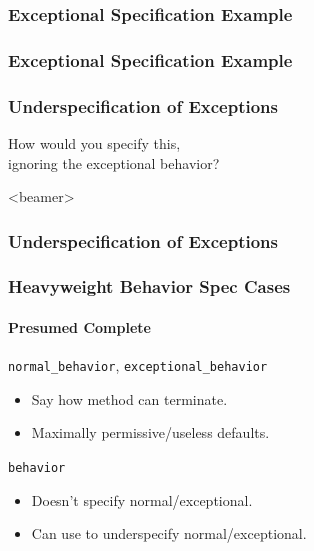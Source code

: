\begin{frame}[fragile]
\frametitle{Exceptional Specification Example}

\end{frame}

\begin{frame}[fragile]
\frametitle{Exceptional Specification Example}

\end{frame}

\begin{frame}
\frametitle{Underspecification of Exceptions}
\begin{question}
How would you specify this, \\
ignoring the exceptional behavior? 
\end{question}
\end{frame}

\begin{frame}<beamer>
\frametitle{Underspecification of Exceptions}

\end{frame}


\begin{frame}[fragile]
\frametitle{Heavyweight Behavior Spec Cases}
\framesubtitle{Presumed Complete}

\lstinline!normal_behavior!, \lstinline!exceptional_behavior!
\begin{itemize}
\item
Say how method can terminate.

\item
Maximally permissive/useless defaults.
\end{itemize}

\lstinline!behavior!
\begin{itemize}
\item
Doesn't specify normal/exceptional.

\item
Can use to underspecify normal/exceptional.
\end{itemize}
\end{frame}

